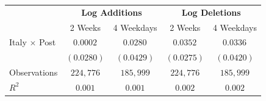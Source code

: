 \begin{tabular}{l|cc|cc}
\hline \hline
 & \multicolumn{2}{c|}{\textbf{Log Additions}} & \multicolumn{2}{c}{\textbf{Log Deletions}} \\
 & 2 Weeks & 4 Weekdays & 2 Weeks & 4 Weekdays \\
\hline
Italy $\times$ Post & $0.0002^{}$ & $0.0280^{}$ & $0.0352^{}$ & $0.0336^{}$ \\
 & $(0.0280)$ & $(0.0429)$ & $(0.0275)$ & $(0.0420)$ \\
\hline
Observations & $224,776$ & $185,999$ & $224,776$ & $185,999$ \\
$R^2$ & $0.001$ & $0.001$ & $0.002$ & $0.002$ \\
\hline \hline
\end{tabular}
